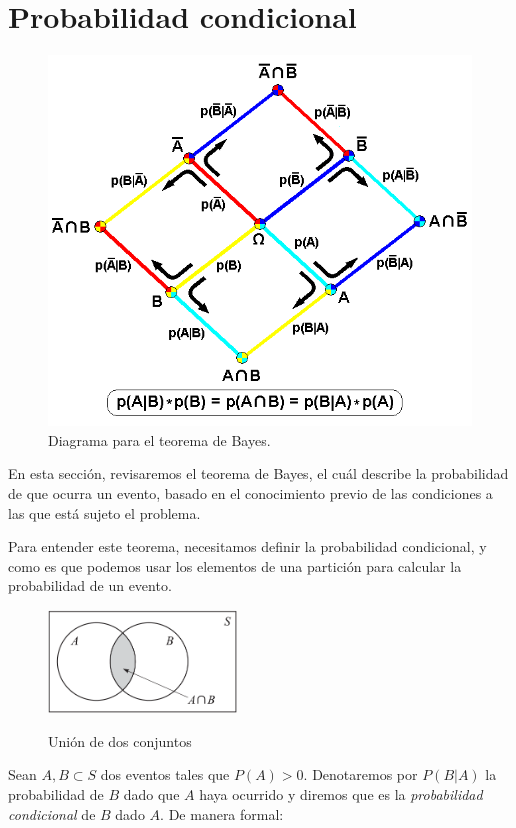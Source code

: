  \section{Probabilidad condicional}

\begin{figure}[b]
	\centering
	\includegraphics[width=0.7\linewidth]{images/Bayes_Theorem_2D}
	\caption{Diagrama para el teorema de Bayes.}
	\label{fig:bayestheorem2d}
\end{figure}


En esta sección, revisaremos el teorema de Bayes, el cuál describe la probabilidad de que ocurra un evento, basado en el conocimiento previo de las condiciones a las que está sujeto el problema. 

Para entender este teorema, necesitamos definir la probabilidad condicional, y como es que podemos usar los elementos de una partición para calcular la probabilidad de un evento.


\begin{figure}
	\centering
	\includegraphics[width=5cm,keepaspectratio=true]{./pe/pands0103.png}
	\label{pands0103}
	\caption{Unión de dos conjuntos}
\end{figure}

Sean $A,B\subset S$ dos eventos tales que $P(A)>0.$ Denotaremos por $P(B|A)$
la probabilidad de $B$ dado que $A$ haya ocurrido y diremos que es la \emph{probabilidad condicional} de $B$ dado $A.$ De manera formal:


